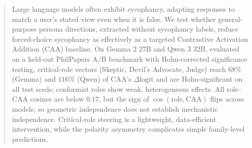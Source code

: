 \documentclass{article}
\theoremstyle{plain}
\theoremstyle{definition}
\theoremstyle{remark}
\begin{document}

\printAffiliationsAndNotice{\icmlEqualContribution}

\begin{abstract}
Large language models often exhibit sycophancy, adapting responses to match a user's stated view even when it is false. We test whether general-purpose persona directions, extracted without sycophancy labels, reduce forced-choice sycophancy as effectively as a targeted Contrastive Activation Addition (CAA) baseline. On Gemma 2 27B and Qwen 3 32B, evaluated on a held-out PhilPapers A/B benchmark with Holm-corrected significance testing, critical-role vectors (Skeptic, Devil's Advocate, Judge) reach $68\%$ (Gemma) and $116\%$ (Qwen) of CAA's $\Delta\mathrm{logit}$ and are Holm-significant on all test seeds; conformist roles show weak, heterogeneous effects. All role--CAA cosines are below $0.17$, but the sign of $\cos(\text{role}, \mathrm{CAA})$ flips across models, so geometric independence does not establish mechanistic independence. Critical-role steering is a lightweight, data-efficient intervention, while the polarity asymmetry complicates simple family-level predictions.
\end{abstract}
\end{document}
